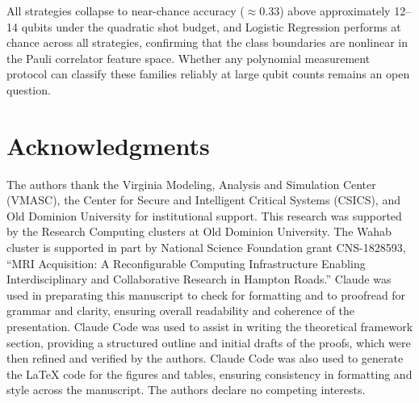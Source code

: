 \documentclass[conference]{IEEEtran}
\begin{document}
All strategies collapse to near-chance accuracy ($\approx 0.33$) above approximately 12--14 qubits under the quadratic shot budget, and Logistic Regression performs at chance across all strategies, confirming that the class boundaries are nonlinear in the Pauli correlator feature space. Whether any polynomial measurement protocol can classify these families reliably at large qubit counts remains an open question.

\section*{Acknowledgments}
The authors thank the Virginia Modeling, Analysis and Simulation Center (VMASC), the 
Center for Secure and Intelligent Critical Systems (CSICS), and Old Dominion University for institutional support. 
This research was supported by the Research Computing clusters at Old Dominion University.
The Wahab cluster is supported in part by National Science Foundation grant CNS-1828593, ``MRI Acquisition: A Reconfigurable Computing Infrastructure Enabling Interdisciplinary and Collaborative Research in Hampton Roads.''
Claude was used in preparating this manuscript to check for formatting and to proofread for grammar and clarity, ensuring overall readability and coherence of the presentation.
Claude Code was used to assist in writing the theoretical framework section, providing a structured outline and initial drafts of the proofs, which were then refined and verified by the authors.
Claude Code was also used to generate the LaTeX code for the figures and tables, ensuring consistency in formatting and style across the manuscript.
The authors declare no competing interests.


\end{document}
